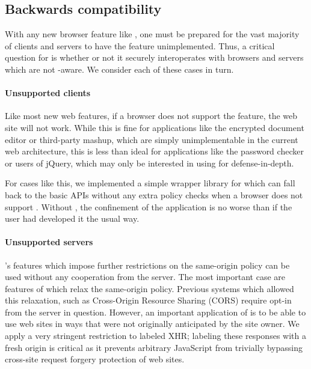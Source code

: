 \subsection{Backwards compatibility}
\label{sec:bc}

With any new browser feature like \sys{}, one must be prepared for the
vast majority of clients and servers to have the feature unimplemented.
Thus, a critical question for \sys{} is whether or not it securely
interoperates with browsers and servers which are not \sys{}-aware.
We consider each of these cases in turn.

\paragraph{Unsupported clients}  Like most new web features, if
a browser does not support the feature, the web site will not
work.  While this is fine for applications like the encrypted
document editor or third-party mashup, which are simply unimplementable
in the current web architecture, this is less than ideal for applications
like the password checker or users of jQuery, which may only be interested
in using \sys{} for defense-in-depth.

For cases like this, we implemented a simple wrapper library for \sys{}
which can fall back to the basic APIs without any extra policy checks
when a browser does not support \sys{}.  Without \sys{}, the confinement
of the application is no worse than if the user had developed it the usual
way.


\paragraph{Unsupported servers}  \sys{}'s features which impose further
restrictions on the same-origin policy can be used without any
cooperation from the server.  The most important case are features
of \sys{} which relax the same-origin policy.  Previous systems which
allowed this relaxation, such as Cross-Origin Resource Sharing (CORS)
require opt-in from the server in question.  However, an important
application of \sys{} is to be able to use web sites in ways that were
not originally anticipated by the site owner.  We apply a very stringent
restriction to labeled XHR\@; labeling these responses with a fresh origin
is critical as it prevents arbitrary JavaScript from trivially bypassing
cross-site request forgery protection of web sites.

